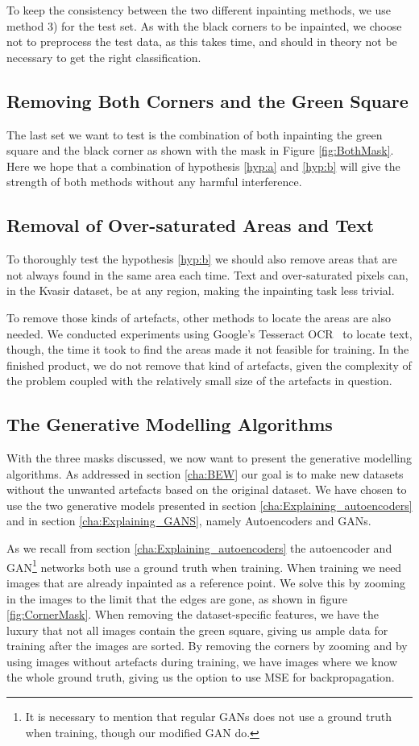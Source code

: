 To keep the consistency between the two different inpainting methods, we use method 3) for the test set.
As with the black corners to be inpainted, we choose not to preprocess the test data, as this takes time, and should in theory not be necessary to get the right classification.
 

\subsection{Removing Both Corners and the Green Square}
The last set we want to test is the combination of both inpainting the green square and the black corner as shown with the mask in Figure \ref{fig:BothMask}. 
Here we hope that a combination of hypothesis \ref{hyp:a} and \ref{hyp:b} will give the strength of both methods without any harmful interference. 

\subsection{Removal of Over-saturated Areas and Text}
To thoroughly test the hypothesis \ref{hyp:b} we should also remove areas that are not always found in the same area each time. Text and over-saturated pixels can, in the Kvasir dataset, be at any region, making the inpainting task less trivial. 

To remove those kinds of artefacts, other methods to locate the areas are also needed. We conducted experiments using Google's Tesseract OCR~\cite{smith2007overview} to locate text, though, the time it took to find the areas made it not feasible for training. 
In the finished product, we do not remove that kind of artefacts, given the complexity of the problem coupled with the relatively small size of the artefacts in question.

\subsection{The Generative Modelling Algorithms}
With the three masks discussed, we now want to present the generative modelling algorithms. As addressed in section \ref{cha:BEW} our goal is to make new datasets without the unwanted artefacts based on the original dataset. 
We have chosen to use the two generative models presented in section \ref{cha:Explaining_autoencoders} and in section \ref{cha:Explaining_GANS}, namely Autoencoders and GANs.


As we recall from section \ref{cha:Explaining_autoencoders} the autoencoder and GAN\footnote{It is necessary to mention that regular GANs does not use a ground truth when training, though our modified GAN do.} networks both use a ground truth when training.
When training we need images that are already inpainted as a reference point. We solve this by zooming in the images to the limit that the edges are gone, as shown in figure \ref{fig:CornerMask}. When removing the dataset-specific features, we have the luxury that not all images contain the green square, giving us ample data for training after the images are sorted.
By removing the corners by zooming and by using images without artefacts during training, we have images where we know the whole ground truth, giving us the option to use MSE for backpropagation.


